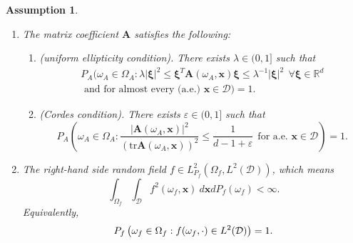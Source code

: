 \documentclass[final,onefignum,onetabnum]{mousaviart}
\newtheorem{assumption}{Assumption}
\begin{document}
	\begin{assumption}
		\label{assum:A-f}
		\textcolor{white}{.}
		\begin{enumerate}[label=\textnormal{(\alph*)}]
			\item 
			\label{assum:matrix-A}
			The matrix coefficient $\boldsymbol{A}$ satisfies the following:
			\begin{enumerate}[label=\textnormal{(\roman*)}]
				\item
				\label{assum:uniform-ellipticity}
				\textnormal{(uniform ellipticity condition)}.
				There exists $\lambda \in (0,1]$ such that
				\begin{multline}
					\label{con:ellipticity}
					P_A
					\Big(
					\omega_A \in \Omega_A : \lambda  \lvert\boldsymbol{\xi}\rvert^2 \leq \boldsymbol{\xi}^T \boldsymbol{A}( \omega_A, \boldsymbol{x}) \boldsymbol{\xi}\leq \lambda^{-1} 
					\lvert\boldsymbol{\xi}\rvert^2 ~~ 
					\forall \boldsymbol{\xi} \in \mathbb{R}^d 
					\\
					\text{ and for almost every (a.e.) } 
					\boldsymbol{x} \in \mathcal{D}
					\Big) =1.
				\end{multline}
				\item
				\label{assum:Cordes-condition}
				\textnormal{(Cordes condition)}. 
				There exists $\varepsilon \in (0,1]$ such that 
				\begin{equation}
					\label{con:cordes}
					P_A \left( 
					\omega_A \in \Omega_A : \dfrac{\lvert \boldsymbol{A}(\omega_A, \boldsymbol{x}) \rvert^2}{\left( \mathrm{tr} {\boldsymbol{A}}(\omega_A, \boldsymbol{x}) \right) ^2}
					\leq
					\dfrac{1}{d-1+\varepsilon} ~~ 
					\text{for a.e. } \boldsymbol{x} \in \mathcal{D}
					\right) = 1. 
				\end{equation}
			\end{enumerate}
			\item 
			The right-hand side random field $f \in L^2_{P_f}(\Omega_f, L^2(\mathcal{D}))$, which means
			\begin{equation}
				\label{assum:on-f-expection}
				\int_{\Omega_f}{\int_{\mathcal{D}} f^2(\omega_f, \boldsymbol{x})~d \boldsymbol{x}} d P_f(\omega_f) 
				< \infty.
			\end{equation}
			Equivalently,
			\begin{equation}
				{\label{assum:on-f}
					P_f\left(  \omega_f \in \Omega_f : f(\omega_f, \cdot) \in L^2(\mathcal{D})  \right) = 1. }
			\end{equation}
		\end{enumerate}
	\end{assumption}
	
\end{document}
